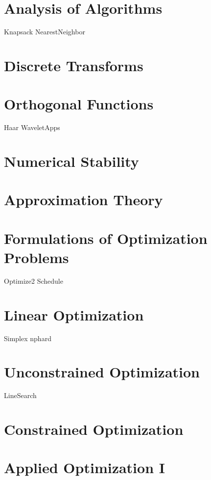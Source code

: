 \documentclass[nociteref]{newsiambook}
\begin{document}
\part{Analysis of Algorithms}
{Knapsack}
{NearestNeighbor}

\part{Discrete Transforms}

\part{Orthogonal Functions}
{Haar}
{WaveletApps}
\part{Numerical Stability}

\part{Approximation Theory}

\part{Formulations of Optimization Problems}
{Optimize2}
{Schedule}

\part{Linear Optimization}
{Simplex}
{nphard}

\part{Unconstrained Optimization}
{LineSearch}
\part{Constrained Optimization}

\part{Applied Optimization I}
\end{document}
